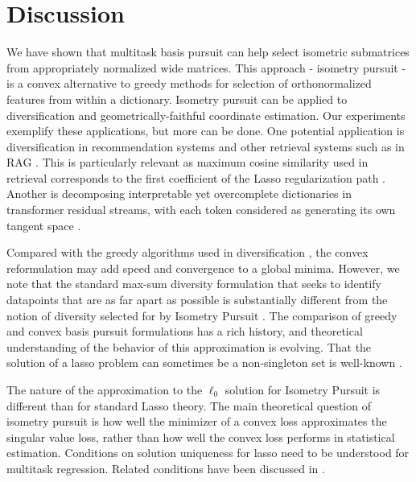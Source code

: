 \section{Discussion}
\label{sec:discussion}

We have shown that multitask basis pursuit can help select isometric submatrices from appropriately normalized wide matrices.
This approach - isometry pursuit - is a convex alternative to greedy methods for selection of orthonormalized features from within a dictionary.
Isometry pursuit can be applied to diversification and geometrically-faithful coordinate estimation.
Our experiments exemplify these applications, but more can be done.
One potential application is diversification in recommendation systems \citep{Carbonell2017-gi, Wu2019-uk, Langchain} and other retrieval systems such as in RAG \citep{Gao2023-cn, Pickett2024-ad, In2024-um, Weiss2024-xm, Vectara}.
This is particularly relevant as maximum cosine similarity used in retrieval corresponds to the first coefficient of the Lasso regularization path \citep{Koelle2022-ju}.
Another is decomposing interpretable yet overcomplete dictionaries in transformer residual streams, with each token considered as generating its own tangent space \citep{templeton2024scaling, Makelov2024-bw}.

Compared with the greedy algorithms used in diversification \citep{Carbonell1998-ji, Barioni, Drosou, Qin2012-ok, KUNAVER2017154, Guo-shengbo, Abdool,Yu2016AGA,  Huang2024-wr, Pickett2024-ad, Cai, Zhu2020-vb}, the convex reformulation may add speed and convergence to a global minima.
However, we note that the standard max-sum diversity formulation that seeks to identify datapoints that are as far apart as possible is substantially different from the notion of diversity selected for by Isometry Pursuit \citep{Kuo1993-zy, Ghosh1996-id, Alfonso-Cevallos-Friedrich-Eisenbrand-and-Rico-Zenklusen2016-ai, Ashkan2015-jv}.
The comparison of greedy \cite{Mallat93-wi, Mallat, Pati-93, Tropp05-ml} and convex \citep{Chen2001-hh, Tropp06-sg,Chen2006TheoreticalRO} basis pursuit formulations has a rich history, and theoretical understanding of the behavior of this approximation is evolving.
That the solution of a lasso problem can sometimes be a non-singleton set is well-known \citep{Osborne2000OnTL, DOSSAL2012117, Chrtien2011OnTG, Tibshirani2012TheLP, Ewald2017OnTD, Ali2018TheGL, Schneider2020-qt, Mishkin2022TheSP,Dupuis2019TheGO,Debarre2020OnTU,Everink2024TheGA}.

The nature of the approximation to the $\ell_0$ solution for Isometry Pursuit is different than for standard Lasso theory.
The main theoretical question of isometry pursuit is how well the minimizer of a convex loss approximates the singular value loss, rather than how well the convex loss performs in statistical estimation.
Conditions on solution uniqueness for lasso need to be understood for multitask regression.
Related conditions have been discussed in \citet{Donoho2006ForML, Mishkin2022TheSP}.

